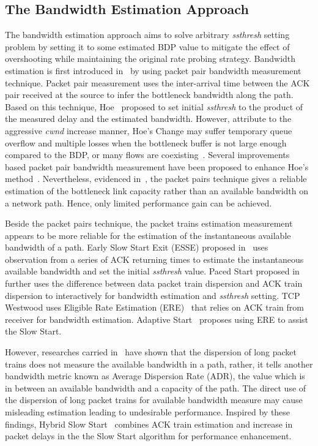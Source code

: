\documentclass[12pt,onecolumn]{IEEEtran}
\begin{document}
\subsection{The Bandwidth Estimation Approach}

The bandwidth estimation approach aims to solve arbitrary \emph{ssthresh}
setting problem by setting it to some estimated BDP value to mitigate the effect of
overshooting while maintaining the original rate probing strategy. Bandwidth
estimation is first introduced in~\cite{first} by using packet pair bandwidth
measurement technique. Packet pair measurement uses the inter-arrival time
between the ACK pair received at the source to infer the bottleneck bandwidth
along the path. Based on this technique, Hoe~\cite{hoe} proposed to set initial
\emph{ssthresh} to the product of the measured delay and the estimated
bandwidth. However, attribute to the aggressive \emph{cwnd} increase manner,
Hoe's Change may suffer temporary queue overflow and multiple losses when the
bottleneck buffer is not large enough compared to the BDP, or many flows are
coexisting~\cite{tcpw-a}. Several improvements based packet pair
bandwidth measurement have been proposed to enhance Hoe's
method~\cite{Aron,swiftstart1,swiftstart2,packetpair1,pacing}. Nevertheless,
evidenced in~\cite{antihoe1,antihoe2}, the packet pairs technique gives a
reliable estimation of the bottleneck link capacity rather than an available
bandwidth on a network path. Hence, only limited performance gain can be
achieved.

Beside the packet pairs technique, the packet trains estimation measurement
appears to be more reliable for the estimation of the instantaneous available
bandwidth of a path. Early Slow Start Exit (ESSE) proposed in~\cite{pipesize}
uses observation from a series of ACK returning times to estimate the
instantaneous available bandwidth and set the initial \emph{ssthresh} value.
Paced Start proposed in \cite{active} further uses the difference between data
packet train dispersion and ACK train dispersion to interactively for bandwidth
estimation and \emph{ssthresh} setting. TCP Westwood uses Eligible Rate
Estimation (ERE)~\cite{westwood} that relies on ACK train from receiver for
bandwidth estimation. Adaptive
Start~\cite{wang} proposes using ERE to assist the Slow Start.

However, researches carried in~\cite{dispersion1,dispersion2} have shown that
the dispersion of long packet trains does not measure the available bandwidth
in a path, rather, it tells another bandwidth metric known as Average
Dispersion Rate (ADR), the value which is in between an available bandwidth and
a capacity of the path. The direct use of the dispersion of long packet trains
for available bandwidth measure may cause misleading estimation leading to
undesirable performance. Inspired by these findings, Hybrid Slow
Start~\cite{Hybrid} combines ACK train estimation and increase in packet delays in
the the Slow Start algorithm for performance enhancement.
\end{document}
